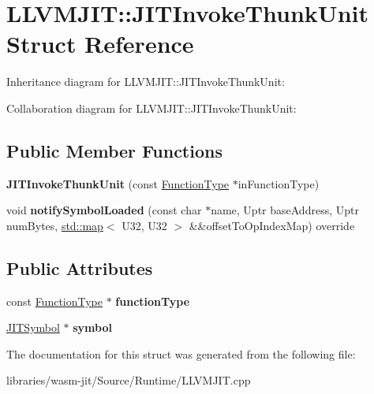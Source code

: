 \hypertarget{struct_l_l_v_m_j_i_t_1_1_j_i_t_invoke_thunk_unit}{}\section{L\+L\+V\+M\+J\+IT\+:\+:J\+I\+T\+Invoke\+Thunk\+Unit Struct Reference}
\label{struct_l_l_v_m_j_i_t_1_1_j_i_t_invoke_thunk_unit}


Inheritance diagram for L\+L\+V\+M\+J\+IT\+:\+:J\+I\+T\+Invoke\+Thunk\+Unit\+:


Collaboration diagram for L\+L\+V\+M\+J\+IT\+:\+:J\+I\+T\+Invoke\+Thunk\+Unit\+:
\subsection*{Public Member Functions}
\begin{DoxyCompactItemize}
\item 
\mbox{\label{struct_l_l_v_m_j_i_t_1_1_j_i_t_invoke_thunk_unit_a7aaf53a1c7616e3605fb93287f47b136}} 
{\bfseries J\+I\+T\+Invoke\+Thunk\+Unit} (const \mbox{\hyperlink{struct_i_r_1_1_function_type}{Function\+Type}} $\ast$in\+Function\+Type)
\item 
\mbox{\label{struct_l_l_v_m_j_i_t_1_1_j_i_t_invoke_thunk_unit_af6e769f4256f6ef7ace4211c5e7f2130}} 
void {\bfseries notify\+Symbol\+Loaded} (const char $\ast$name, Uptr base\+Address, Uptr num\+Bytes, \mbox{\hyperlink{classstd_1_1map}{std\+::map}}$<$ U32, U32 $>$ \&\&offset\+To\+Op\+Index\+Map) override
\end{DoxyCompactItemize}
\subsection*{Public Attributes}
\begin{DoxyCompactItemize}
\item 
\mbox{\label{struct_l_l_v_m_j_i_t_1_1_j_i_t_invoke_thunk_unit_ad7491a57a2f7f6d8fd0459da038091f7}} 
const \mbox{\hyperlink{struct_i_r_1_1_function_type}{Function\+Type}} $\ast$ {\bfseries function\+Type}
\item 
\mbox{\label{struct_l_l_v_m_j_i_t_1_1_j_i_t_invoke_thunk_unit_aead8b603a4828c58122a8fc0e5fe961b}} 
\mbox{\hyperlink{struct_l_l_v_m_j_i_t_1_1_j_i_t_symbol}{J\+I\+T\+Symbol}} $\ast$ {\bfseries symbol}
\end{DoxyCompactItemize}


The documentation for this struct was generated from the following file\+:\begin{DoxyCompactItemize}
\item 
libraries/wasm-\/jit/\+Source/\+Runtime/L\+L\+V\+M\+J\+I\+T.\+cpp\end{DoxyCompactItemize}
